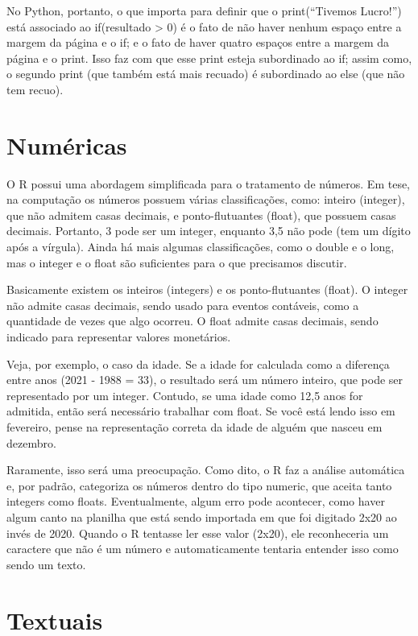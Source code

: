 \documentclass[
]{book}
\begin{document}
No Python, portanto, o que importa para definir que o print(``Tivemos Lucro!'') está associado ao if(resultado \textgreater{} 0) é o fato de não haver nenhum espaço entre a margem da página e o if; e o fato de haver quatro espaços entre a margem da página e o print. Isso faz com que esse print esteja subordinado ao if; assim como, o segundo print (que também está mais recuado) é subordinado ao else (que não tem recuo).

\hypertarget{numuxe9ricas}{%
\section{Numéricas}\label{numuxe9ricas}}

O R possui uma abordagem simplificada para o tratamento de números. Em tese, na computação os números possuem várias classificações, como: inteiro (integer), que não admitem casas decimais, e ponto-flutuantes (float), que possuem casas decimais. Portanto, 3 pode ser um integer, enquanto 3,5 não pode (tem um dígito após a vírgula). Ainda há mais algumas classificações, como o double e o long, mas o integer e o float são suficientes para o que precisamos discutir.

Basicamente existem os inteiros (integers) e os ponto-flutuantes (float). O integer não admite casas decimais, sendo usado para eventos contáveis, como a quantidade de vezes que algo ocorreu. O float admite casas decimais, sendo indicado para representar valores monetários.

Veja, por exemplo, o caso da idade. Se a idade for calculada como a diferença entre anos (2021 - 1988 = 33), o resultado será um número inteiro, que pode ser representado por um integer. Contudo, se uma idade como 12,5 anos for admitida, então será necessário trabalhar com float. Se você está lendo isso em fevereiro, pense na representação correta da idade de alguém que nasceu em dezembro.

Raramente, isso será uma preocupação. Como dito, o R faz a análise automática e, por padrão, categoriza os números dentro do tipo numeric, que aceita tanto integers como floats. Eventualmente, algum erro pode acontecer, como haver algum canto na planilha que está sendo importada em que foi digitado 2x20 ao invés de 2020. Quando o R tentasse ler esse valor (2x20), ele reconheceria um caractere que não é um número e automaticamente tentaria entender isso como sendo um texto.

\hypertarget{textuais}{%
\section{Textuais}\label{textuais}}
\end{document}
